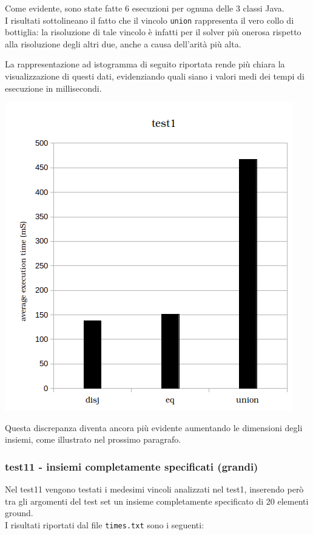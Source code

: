 

Come evidente, sono state fatte 6 esecuzioni per ognuna delle 3 classi Java.\\
I risultati sottolineano il fatto che il vincolo \texttt{union} rappresenta il vero collo di bottiglia: la risoluzione di tale vincolo è infatti per il solver più onerosa rispetto alla risoluzione degli altri due, anche a causa dell'arità più alta.

La rappresentazione ad istogramma di seguito riportata rende più chiara la visualizzazione di questi dati, evidenziando quali siano i valori medi dei tempi di esecuzione in millisecondi.\\

\begin{center}
\includegraphics[scale=0.8]{images/histogram_test1.png}
\end{center}

Questa discrepanza diventa ancora più evidente aumentando le dimensioni degli insiemi, come illustrato nel prossimo paragrafo.\\

\subsubsection{test11 - insiemi completamente specificati (grandi)}
Nel test11 vengono testati i medesimi vincoli analizzati nel test1, inserendo però tra gli argomenti del test set un insieme completamente specificato di 20 elementi ground.\\
\clearpage
I risultati riportati dal file \texttt{times.txt} sono i seguenti:\\

